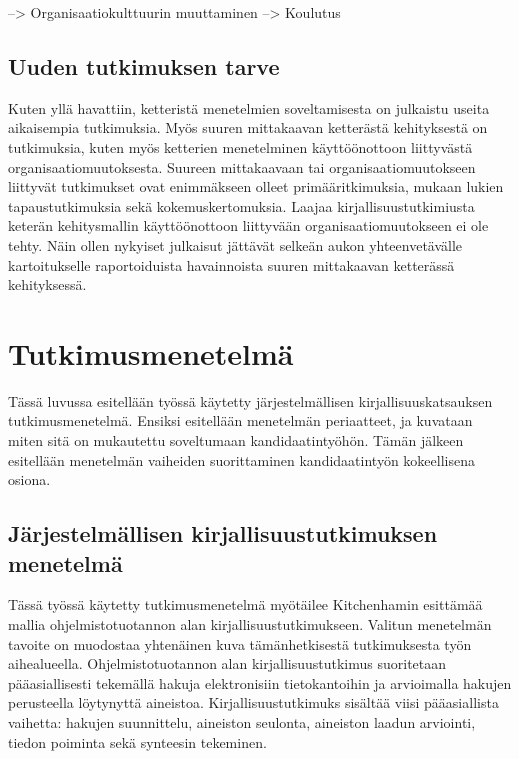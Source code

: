 --> Organisaatiokulttuurin muuttaminen \newline
--> Koulutus

\subsection{Uuden tutkimuksen tarve}
Kuten yllä havattiin, ketteristä menetelmien soveltamisesta on julkaistu useita
aikaisempia tutkimuksia. Myös suuren mittakaavan ketterästä kehityksestä on
tutkimuksia, kuten myös ketterien menetelminen käyttöönottoon liittyvästä
organisaatiomuutoksesta. Suureen mittakaavaan tai organisaatiomuutokseen
liittyvät tutkimukset ovat enimmäkseen olleet primääritkimuksia, mukaan lukien
tapaustutkimuksia sekä kokemuskertomuksia. Laajaa kirjallisuustutkimiusta
keterän kehitysmallin käyttöönottoon liittyvään organisaatiomuutokseen ei ole
tehty. Näin ollen nykyiset julkaisut jättävät selkeän aukon yhteenvetävälle
kartoitukselle raportoiduista havainnoista suuren mittakaavan ketterässä
kehityksessä.


\section{Tutkimusmenetelmä}
\label{sec:menetelma}

Tässä luvussa esitellään työssä käytetty järjestelmällisen
kirjallisuuskatsauksen tutkimusmenetelmä. Ensiksi esitellään menetelmän
periaatteet, ja kuvataan miten sitä on mukautettu soveltumaan kandidaatintyöhön.
Tämän jälkeen esitellään menetelmän vaiheiden suorittaminen kandidaatintyön
kokeellisena osiona.

\subsection{Järjestelmällisen kirjallisuustutkimuksen menetelmä}

Tässä työssä käytetty tutkimusmenetelmä myötäilee Kitchenhamin esittämää mallia
ohjelmistotuotannon alan kirjallisuustutkimukseen. Valitun menetelmän tavoite on
muodostaa yhtenäinen kuva tämänhetkisestä tutkimuksesta työn aihealueella.
Ohjelmistotuotannon alan kirjallisuustutkimus suoritetaan pääasiallisesti
tekemällä hakuja elektronisiin tietokantoihin ja arvioimalla hakujen perusteella
löytynyttä aineistoa. Kirjallisuustutkimuks sisältää viisi pääasiallista
vaihetta: hakujen suunnittelu, aineiston seulonta, aineiston laadun arviointi,
tiedon poiminta sekä synteesin tekeminen. 

